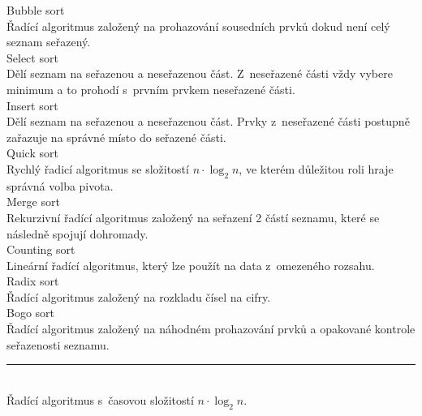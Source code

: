 \documentclass[12pt,a4paper]{article}
\begin{document}
\pagestyle{empty}

\setlength\parindent{0pt}
\setlength{\columnsep}{60pt}
\begin{multicols}{2}

\Large

Bubble sort\\

Řadící algoritmus založený na prohazování sousedních prvků dokud není celý
seznam seřazený.\\

Select sort\\

Dělí seznam na seřazenou a neseřazenou část. Z~neseřazené části vždy
vybere minimum a to prohodí s~prvním prvkem neseřazené části.\\

Insert sort\\

Dělí seznam na seřazenou a neseřazenou část. Prvky z~neseřazené části postupně
zařazuje na správné místo do seřazené části.\\

Quick sort\\

Rychlý řadicí algoritmus se složitostí $n \cdot \log_2{n}$, ve kterém důležitou
roli hraje správná volba pivota.\\

Merge sort\\

Rekurzivní řadící algoritmus založený na seřazení 2 částí seznamu, které se
následně spojují dohromady.\\

Counting sort\\

Lineární řadící algoritmus, který lze použít na data z~omezeného rozsahu.\\

Radix sort\\

Řadící algoritmus založený na rozkladu čísel na cifry.\\

Bogo sort\\

Řadící algoritmus založený na náhodném prohazování prvků a opakované kontrole
seřazenosti seznamu.\\

\rule{\linewidth}{1pt}\\

Řadící algoritmus s~časovou složitostí $n \cdot \log_2{n}$.

\end{multicols}
\end{document}
